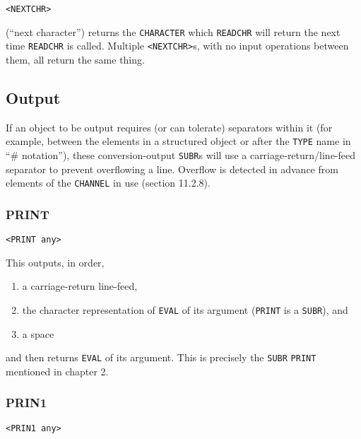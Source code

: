 \documentclass[a4paper]{scrbook}
\providecommand{\tightlist}{%
  \setlength{\itemsep}{0pt}\setlength{\parskip}{0pt}}
\begin{document}
\begin{verbatim}
<NEXTCHR>
\end{verbatim}

 (``next character'') returns the \texttt{CHARACTER} which \texttt{READCHR} will return the
next time \texttt{READCHR} is called. Multiple \texttt{\textless{}NEXTCHR\textgreater{}}s, with no input operations between
them, all return the same thing.

\subsection{Output}\label{output}

If an object to be output requires (or can tolerate) separators within it (for example, between the elements in a
structured object or after the \texttt{TYPE} name in ``\# notation''), these conversion-output \texttt{SUBR}s will use a
carriage-return/line-feed separator to prevent overflowing a line. Overflow is detected in advance from elements of the
\texttt{CHANNEL} in use (section 11.2.8).

\subsubsection{PRINT}\label{print}

\begin{verbatim}
<PRINT any>
\end{verbatim}

 This outputs, in order,

\begin{enumerate}
\def\labelenumi{\arabic{enumi}.}
\tightlist
\item
  a carriage-return line-feed,
\item
  the character representation of \texttt{EVAL} of its argument (\texttt{PRINT} is a \texttt{SUBR}), and
\item
  a space
\end{enumerate}

and then returns \texttt{EVAL} of its argument. This is precisely the \texttt{SUBR} \texttt{PRINT} mentioned in chapter 2.

\subsubsection{PRIN1}\label{prin1}

\begin{verbatim}
<PRIN1 any>
\end{verbatim}
\end{document}
